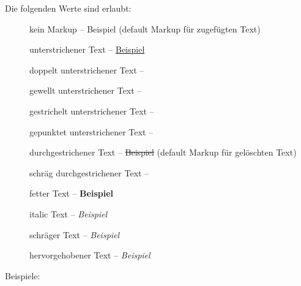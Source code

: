 		Die folgenden Werte sind erlaubt:
		\begin{description}
			\item [] kein Markup -- Beispiel (default Markup für zugefügten Text)
			\item [] unterstrichener Text -- \uline{Beispiel}
			\item [] doppelt unterstrichener Text -- 
			\item [] gewellt unterstrichener Text -- 
			\item [] gestrichelt unterstrichener Text -- 
			\item [] gepunktet unterstrichener Text -- 
			\item [] durchgestrichener Text -- \sout{Beispiel} (default Markup für gelöschten Text)
			\item [] schräg durchgestrichener Text -- 
			\item [] fetter Text -- \textbf{Beispiel}
			\item [] italic Text -- \textit{Beispiel}
			\item [] schräger Text -- \textsl{Beispiel}
			\item [] hervorgehobener Text -- \emph{Beispiel}
		\end{description}

		Beispiele:
	\fi

\\
\\
\\
\\



\\
\\
\\


